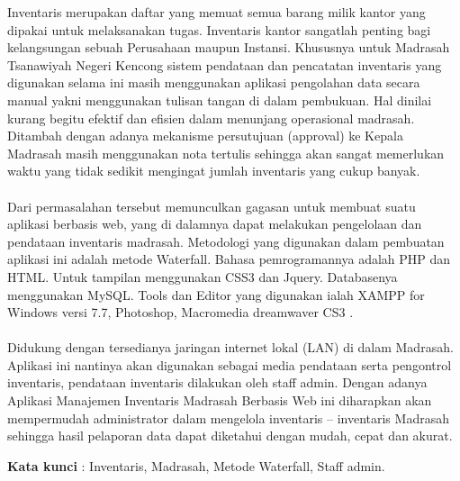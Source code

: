 \documentclass{jtetiproposalskripsi}
\begin{document}
\cover

\approvalpage


\begin{abstractind}
Inventaris merupakan daftar yang memuat semua barang milik kantor yang dipakai untuk melaksanakan tugas. Inventaris kantor sangatlah penting bagi kelangsungan sebuah Perusahaan maupun Instansi. Khususnya untuk Madrasah Tsanawiyah Negeri Kencong sistem pendataan dan pencatatan inventaris  yang digunakan selama ini masih menggunakan aplikasi pengolahan data secara manual yakni menggunakan tulisan tangan di dalam pembukuan. Hal dinilai kurang begitu efektif dan efisien dalam menunjang operasional madrasah. Ditambah dengan adanya mekanisme persutujuan (approval) ke Kepala Madrasah masih menggunakan nota tertulis sehingga akan sangat memerlukan waktu yang tidak sedikit mengingat jumlah inventaris yang cukup banyak.
\paragraph{}
Dari permasalahan tersebut memunculkan gagasan untuk membuat suatu aplikasi berbasis web, yang di dalamnya dapat melakukan pengelolaan dan pendataan inventaris madrasah. Metodologi yang digunakan dalam pembuatan aplikasi ini adalah metode Waterfall. Bahasa pemrogramannya adalah PHP dan HTML. Untuk tampilan menggunakan CSS3 dan Jquery. Databasenya menggunakan MySQL. Tools dan Editor yang digunakan ialah XAMPP for Windows versi 7.7, Photoshop, Macromedia dreamwaver CS3 .
\paragraph{}
Didukung dengan tersedianya jaringan internet lokal (LAN) di dalam Madrasah. Aplikasi ini nantinya akan digunakan sebagai media pendataan serta pengontrol inventaris, pendataan inventaris dilakukan oleh staff admin. Dengan adanya Aplikasi Manajemen Inventaris Madrasah Berbasis Web ini diharapkan akan mempermudah administrator dalam mengelola inventaris – inventaris Madrasah  sehingga hasil pelaporan data dapat diketahui dengan mudah, cepat dan akurat.



\bigskip
\textbf{Kata kunci} : Inventaris, Madrasah, Metode Waterfall, Staff admin.
\end{abstractind}
\end{document}
